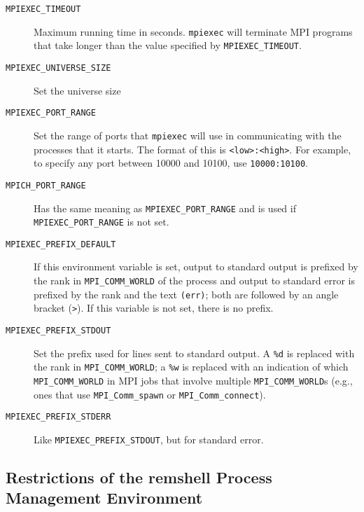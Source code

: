 \documentclass[dvipdfm,11pt]{article}
\begin{document}
\begin{description}
\item[\texttt{MPIEXEC\_TIMEOUT}]Maximum running time in seconds.
\texttt{mpiexec} will terminate MPI programs that take longer than the value
specified by \texttt{MPIEXEC\_TIMEOUT}.  
\item[\texttt{MPIEXEC\_UNIVERSE\_SIZE}]Set the universe size
\item[\texttt{MPIEXEC\_PORT\_RANGE}]Set the range of ports that
\texttt{mpiexec} will use  
  in communicating with the processes that it starts.  The format of 
  this is \texttt{<low>:<high>}.  For example, to specify any port between
  10000 and 10100, use \texttt{10000:10100}.  
\item[\texttt{MPICH\_PORT\_RANGE}]Has the same meaning as
\texttt{MPIEXEC\_PORT\_RANGE} and is used if \texttt{MPIEXEC\_PORT\_RANGE} is
not set. 
\item[\texttt{MPIEXEC\_PREFIX\_DEFAULT}]If this environment variable is set,
output to standard output is prefixed by the rank in \texttt{MPI\_COMM\_WORLD}
of the process and output to standard error is prefixed by the rank and the
text \texttt{(err)}; both are followed by an angle bracket (\texttt{>}).  If 
  this variable is not set, there is no prefix.
\item[\texttt{MPIEXEC\_PREFIX\_STDOUT}]Set the prefix used for lines sent to
standard output.  A \texttt{\%d} is replaced with the rank in
\texttt{MPI\_COMM\_WORLD}; a \texttt{\%w} is replaced with an indication of
which \texttt{MPI\_COMM\_WORLD} in MPI jobs that involve multiple
\texttt{MPI\_COMM\_WORLD}s (e.g., ones that use \texttt{MPI\_Comm\_spawn} or
\texttt{MPI\_Comm\_connect}). 
\item[\texttt{MPIEXEC\_PREFIX\_STDERR}]Like \texttt{MPIEXEC\_PREFIX\_STDOUT},
but for standard error. 
\end{description}

\subsection{Restrictions of the remshell Process Management Environment}
\label{sec:restrictions-remshell}
\end{document}
